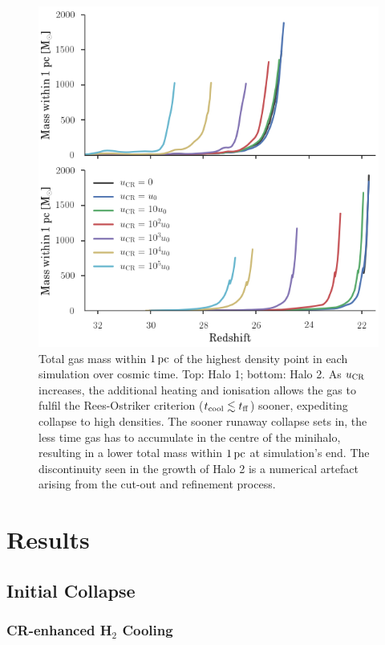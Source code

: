 \documentclass[usenatbib]{mn2e}
\newcommand{\pc}{\,{\rm pc}}
\newcommand{\ucr}{{u}_{\rm \small CR}}
\begin{document}
\begin{figure}
\begin{center}
\includegraphics[width=.95\columnwidth]{figures/collapse/collapse}
\caption{\label{fig:collapse}
Total gas mass within $1\pc$ of the highest density point in each simulation over cosmic time.
Top: Halo 1; bottom: Halo 2.
As $\ucr$ increases, the additional heating and ionisation allows the gas to fulfil the Rees-Ostriker criterion ($t_{\rm cool} \lesssim t_{\rm ff}$) sooner, expediting collapse to high densities.  
The sooner runaway collapse sets in, the less time gas has to accumulate in the centre of the minihalo, resulting in a lower total mass within $1\pc$ at simulation's end.
The discontinuity seen in the growth of Halo 2 is a numerical artefact arising from the cut-out and refinement process.%
}
\end{center}
\end{figure}

\section{Results}
\label{sec:results}
\subsection{Initial Collapse}
\subsubsection{CR-enhanced H$_2$ Cooling}
\label{sec:initial_collapse}
\end{document}

